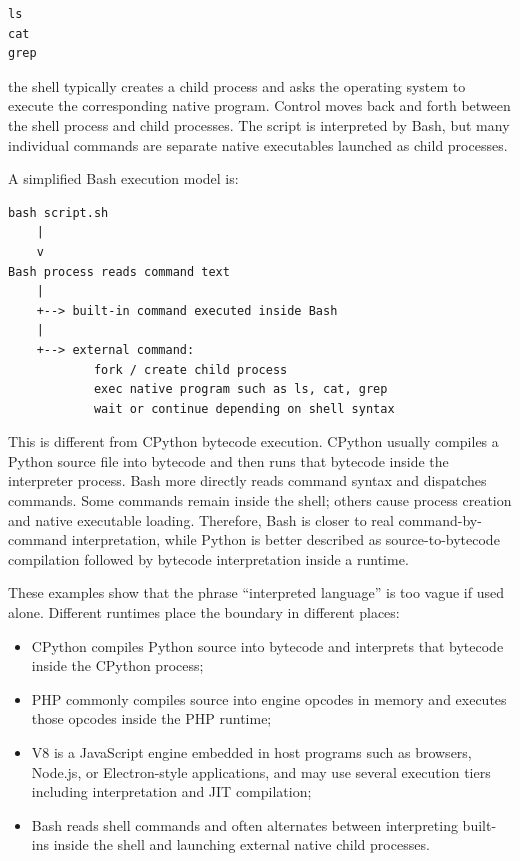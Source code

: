 \documentclass[a4paper,twoside]{report}
\begin{document}
\begin{verbatim}
ls
cat
grep
\end{verbatim}

the shell typically creates a child process and asks the operating system to execute the corresponding native program. Control moves back and forth between the shell process and child processes. The script is interpreted by Bash, but many individual commands are separate native executables launched as child processes.

A simplified Bash execution model is:

\begin{verbatim}
bash script.sh
    |
    v
Bash process reads command text
    |
    +--> built-in command executed inside Bash
    |
    +--> external command:
            fork / create child process
            exec native program such as ls, cat, grep
            wait or continue depending on shell syntax
\end{verbatim}

This is different from CPython bytecode execution. CPython usually compiles a Python source file into bytecode and then runs that bytecode inside the interpreter process. Bash more directly reads command syntax and dispatches commands. Some commands remain inside the shell; others cause process creation and native executable loading. Therefore, Bash is closer to real command-by-command interpretation, while Python is better described as source-to-bytecode compilation followed by bytecode interpretation inside a runtime.

These examples show that the phrase ``interpreted language'' is too vague if used alone. Different runtimes place the boundary in different places:

\begin{itemize}
    \item CPython compiles Python source into bytecode and interprets that bytecode inside the CPython process;
    \item PHP commonly compiles source into engine opcodes in memory and executes those opcodes inside the PHP runtime;
    \item V8 is a JavaScript engine embedded in host programs such as browsers, Node.js, or Electron-style applications, and may use several execution tiers including interpretation and JIT compilation;
    \item Bash reads shell commands and often alternates between interpreting built-ins inside the shell and launching external native child processes.
\end{itemize}
\end{document}
